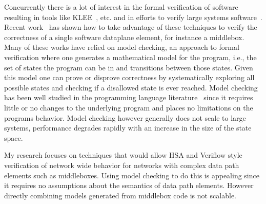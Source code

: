 \documentclass[letterpaper]{article}
\begin{document}
Concurrently there is a lot of interest in the formal verification of software resulting in tools
like KLEE~\cite{cadar2008klee}, etc. and in efforts to verify large systems software~\cite{klein2009sel4}.
Recent work~\cite{dobrescu2014software} has shown how to take advantage of these techniques to verify the
correctness of a single software dataplane element, for instance a middlebox. Many of these works have relied
on model checking, an approach to formal verification where one generates a mathematical model for the
program, i.e., the set of states the program can be in and transitions between those states. Given this model
one can prove or disprove correctness by systematically exploring all possible states and checking if a
disallowed state is ever reached. Model checking has been well studied in the programming language
literature~\cite{jhala2009software, han2007providing} since it requires little or no changes to the underlying
program and places no limitations on the programs behavior. Model checking however generally does not scale to
large systems, performance degrades rapidly with an increase in the size of the state space. 

My research focuses on techniques that would allow HSA and Veriflow style verification of network wide
behavior for networks with complex data path elements such as middleboxes. Using model checking to do this is
appealing since it requires no assumptions about the semantics of data path elements. However directly
combining models generated from middlebox code is not scalable.  


\end{document}
